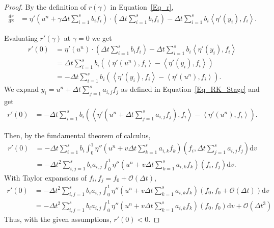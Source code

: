 \documentclass{report}
\newcommand{\inner}[2]{\left< #1 , #2 \right>}
\begin{document}
    \begin{proof}
        By the definition of \(r(\gamma)\) in Equation~\ref{Eq_r},
        \begin{align*}
            \frac{dr}{d\gamma}  &= \eta'(u^n + \gamma \Delta t \sum_{i=1}^{s}b_if_i) \cdot \left(\Delta t \sum_{i=1}^{s}b_if_i\right) - \Delta t \sum_{i=1}^{s}b_i\inner{\eta'(y_i)}{f_i}.
        \end{align*}

        Evaluating \(r'(\gamma)\) at \(\gamma = 0\) we get
        \begin{align*}
            r'(0)   &= \eta'(u^n) \cdot \left(\Delta t \sum_{i=1}^{s}b_if_i\right) - \Delta t \sum_{i=1}^{s}b_i\inner{\eta'(y_i)}{f_i}\\
                    &= \Delta t \sum_{i=1}^{s}b_i \left( \inner{\eta'(u^n)}{f_i} - \inner{\eta'(y_i)}{f_i}\right) \\
                    &= -\Delta t \sum_{i=1}^{s}b_i \left( \inner{\eta'(y_i)}{f_i} - \inner{\eta'(u^n)}{f_i}\right).
        \end{align*}
        We expand \(y_i = u^n + \Delta t \sum_{j=1}^{s}a_{i,j}f_j\) as defined in Equation~\ref{Eq_RK_Stage} and get
        \begin{align*}
            r'(0) &= -\Delta t \sum_{i=1}^{s}b_i \left( \inner{\eta'\left(u^n + \Delta t \sum_{j=1}^{s}a_{i,j}f_j\right)}{f_i} - \inner{\eta'(u^n)}{f_i}\right).
        \end{align*}


        Then, by the fundamental theorem of calculus,
        \begin{align*}
            r'(0)   &= -\Delta t \sum_{i=1}^{s}b_i \int_{0}^{1}\eta''\left(u^n + v\Delta t \sum_{k=1}^{s}a_{i,k}f_k\right)\left(f_i,\Delta t \sum_{j=1}^{s}a_{i,j}f_j\right)\text{d}v \\
                    &= -\Delta t^2 \sum_{i,j=1}^{s}b_ia_{i,j} \int_{0}^{1}\eta''\left(u^n + v\Delta t \sum_{k=1}^{s}a_{i,k}f_k\right)\left(f_i,f_j\right)\text{d}v.
        \end{align*}
        With Taylor expansions of \(f_i, f_j = f_0 + \mathcal{O}(\Delta t)\),
        \begin{align*}
            r'(0)   &= -\Delta t^2 \sum_{i,j=1}^{s}b_ia_{i,j} \int_{0}^{1}\eta''\left(u^n + v\Delta t \sum_{k=1}^{s}a_{i,k}f_k\right)\left(f_0,f_0 + \mathcal{O}(\Delta t)\right)\text{d}v\\
                    &= -\Delta t^2 \sum_{i,j=1}^{s}b_ia_{i,j} \int_{0}^{1}\eta''\left(u^n + v\Delta t \sum_{k=1}^{s}a_{i,k}f_k\right)\left(f_0,f_0 \right)\text{d}v + \mathcal{O}(\Delta t^3)
        \end{align*}
        Thus, with the given assumptions, \(r'(0)<0\).
    \end{proof}
\end{document}
